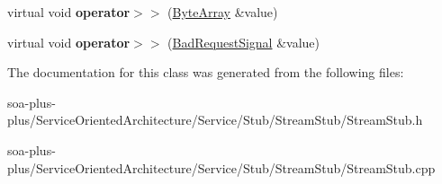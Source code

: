 \begin{DoxyCompactItemize}
\item 
\hypertarget{class_stream_stub_abf4f3c4bd3b3f4f71f45a13c015321ef}{
virtual void {\bfseries operator$>$$>$} (\hyperlink{class_byte_array}{ByteArray} \&value)}
\label{class_stream_stub_abf4f3c4bd3b3f4f71f45a13c015321ef}

\item 
\hypertarget{class_stream_stub_a4366e27c70855802cbc85de23c8dd9e8}{
virtual void {\bfseries operator$>$$>$} (\hyperlink{class_bad_request_signal}{BadRequestSignal} \&value)}
\label{class_stream_stub_a4366e27c70855802cbc85de23c8dd9e8}

\end{DoxyCompactItemize}


The documentation for this class was generated from the following files:\begin{DoxyCompactItemize}
\item 
soa-\/plus-\/plus/ServiceOrientedArchitecture/Service/Stub/StreamStub/StreamStub.h\item 
soa-\/plus-\/plus/ServiceOrientedArchitecture/Service/Stub/StreamStub/StreamStub.cpp\end{DoxyCompactItemize}
